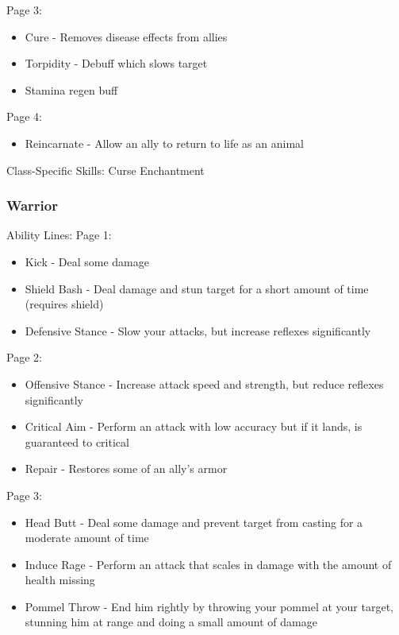 \documentclass{article}
\begin{document}
Page 3:
\begin{itemize}
    \item Cure - Removes disease effects from allies
    \item Torpidity - Debuff which slows target
    \item Stamina regen buff
    
\end{itemize}

Page 4:
\begin{itemize}
    \item Reincarnate - Allow an ally to return to life as an animal
    
\end{itemize}


Class-Specific Skills:
Curse
Enchantment


\subsubsection{Warrior}
Ability Lines:
Page 1:
\begin{itemize}
    \item Kick - Deal some damage
    \item Shield Bash -  Deal damage and stun target for a short amount of time (requires shield)
    \item Defensive Stance - Slow your attacks, but increase reflexes significantly
    
\end{itemize}

Page 2:
\begin{itemize}
    \item Offensive Stance - Increase attack speed and strength, but reduce reflexes significantly
    \item Critical Aim - Perform an attack with low accuracy but if it lands, is guaranteed to critical
    \item Repair - Restores some of an ally's armor
    
\end{itemize}

Page 3:
\begin{itemize}
    \item Head Butt - Deal some damage and prevent target from casting for a moderate amount of time
    \item Induce Rage - Perform an attack that scales in damage with the amount of health missing
    \item Pommel Throw - End him rightly by throwing your pommel at your target, stunning him at range and doing a small amount of damage
    
\end{itemize}
\end{document}

